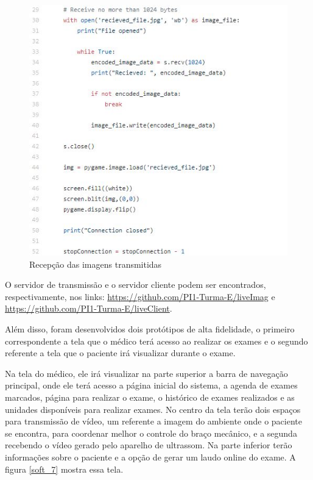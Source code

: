 \begin{figure}[H]
	\centering	\includegraphics[keepaspectratio=true,scale=1]{figuras/2_5_carregar_cliente.jpg}
	\caption{Recepção das imagens transmitidas}
	\label{soft_6}
\end{figure}

O servidor de transmissão e o servidor cliente podem ser encontrados, respectivamente, nos links: \hyperlink{Servidor de transmissão}{https://github.com/PI1-Turma-E/liveImag} e \hyperlink{Servidor client}{https://github.com/PI1-Turma-E/liveClient}.

Além disso, foram desenvolvidos dois protótipos de alta fidelidade, o primeiro correspondente a tela que o médico terá acesso ao realizar os exames e o segundo referente a tela que o paciente irá visualizar durante o exame.

Na tela do médico, ele irá visualizar na parte superior a barra de navegação principal, onde ele terá acesso a página inicial do sistema, a agenda de exames marcados, página para realizar o exame, o histórico de exames realizados e as unidades disponíveis para realizar exames. No centro da tela terão dois espaços para transmissão de vídeo, um referente a imagem do ambiente onde o paciente se encontra, para coordenar melhor o controle do braço mecânico, e a segunda recebendo o vídeo gerado pelo aparelho de ultrassom. Na parte inferior terão informações sobre o paciente e a opção de gerar um laudo online do exame. A figura \ref{soft_7} mostra essa tela.

